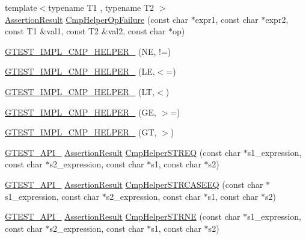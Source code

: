 \begin{DoxyCompactItemize}
\item 
{\footnotesize template$<$typename T1 , typename T2 $>$ }\\\mbox{\hyperlink{classtesting_1_1_assertion_result}{Assertion\+Result}} \mbox{\hyperlink{namespacetesting_1_1internal_a894ffccd936d78fd555f490020c27f0a}{Cmp\+Helper\+Op\+Failure}} (const char $\ast$expr1, const char $\ast$expr2, const T1 \&val1, const T2 \&val2, const char $\ast$op)
\item 
\mbox{\hyperlink{namespacetesting_1_1internal_aa14e3caa94126d7fb8e06bfb3d24ae4a}{G\+T\+E\+S\+T\+\_\+\+I\+M\+P\+L\+\_\+\+C\+M\+P\+\_\+\+H\+E\+L\+P\+E\+R\+\_\+}} (NE, !=)
\item 
\mbox{\hyperlink{namespacetesting_1_1internal_ade60646b18728043fff84d7b4125de2c}{G\+T\+E\+S\+T\+\_\+\+I\+M\+P\+L\+\_\+\+C\+M\+P\+\_\+\+H\+E\+L\+P\+E\+R\+\_\+}} (LE,$<$=)
\item 
\mbox{\hyperlink{namespacetesting_1_1internal_aabcbff15eac496f8487699d19f42c274}{G\+T\+E\+S\+T\+\_\+\+I\+M\+P\+L\+\_\+\+C\+M\+P\+\_\+\+H\+E\+L\+P\+E\+R\+\_\+}} (LT,$<$)
\item 
\mbox{\hyperlink{namespacetesting_1_1internal_af969886067930ce70f6405cd5aa8b06b}{G\+T\+E\+S\+T\+\_\+\+I\+M\+P\+L\+\_\+\+C\+M\+P\+\_\+\+H\+E\+L\+P\+E\+R\+\_\+}} (GE, $>$=)
\item 
\mbox{\hyperlink{namespacetesting_1_1internal_a7fdb4fc164db83c51dfad17640bfeae9}{G\+T\+E\+S\+T\+\_\+\+I\+M\+P\+L\+\_\+\+C\+M\+P\+\_\+\+H\+E\+L\+P\+E\+R\+\_\+}} (GT, $>$)
\item 
\mbox{\hyperlink{gtest-port_8h_aa73be6f0ba4a7456180a94904ce17790}{G\+T\+E\+S\+T\+\_\+\+A\+P\+I\+\_\+}} \mbox{\hyperlink{classtesting_1_1_assertion_result}{Assertion\+Result}} \mbox{\hyperlink{namespacetesting_1_1internal_a93eb9d61cac7faf1faff6301ae5f4a46}{Cmp\+Helper\+S\+T\+R\+EQ}} (const char $\ast$s1\+\_\+expression, const char $\ast$s2\+\_\+expression, const char $\ast$s1, const char $\ast$s2)
\item 
\mbox{\hyperlink{gtest-port_8h_aa73be6f0ba4a7456180a94904ce17790}{G\+T\+E\+S\+T\+\_\+\+A\+P\+I\+\_\+}} \mbox{\hyperlink{classtesting_1_1_assertion_result}{Assertion\+Result}} \mbox{\hyperlink{namespacetesting_1_1internal_a00c3d012df6173622ef558a131bfb95d}{Cmp\+Helper\+S\+T\+R\+C\+A\+S\+E\+EQ}} (const char $\ast$s1\+\_\+expression, const char $\ast$s2\+\_\+expression, const char $\ast$s1, const char $\ast$s2)
\item 
\mbox{\hyperlink{gtest-port_8h_aa73be6f0ba4a7456180a94904ce17790}{G\+T\+E\+S\+T\+\_\+\+A\+P\+I\+\_\+}} \mbox{\hyperlink{classtesting_1_1_assertion_result}{Assertion\+Result}} \mbox{\hyperlink{namespacetesting_1_1internal_a6b485231a046ff760844a0321c04870b}{Cmp\+Helper\+S\+T\+R\+NE}} (const char $\ast$s1\+\_\+expression, const char $\ast$s2\+\_\+expression, const char $\ast$s1, const char $\ast$s2)

\end{DoxyCompactItemize}
